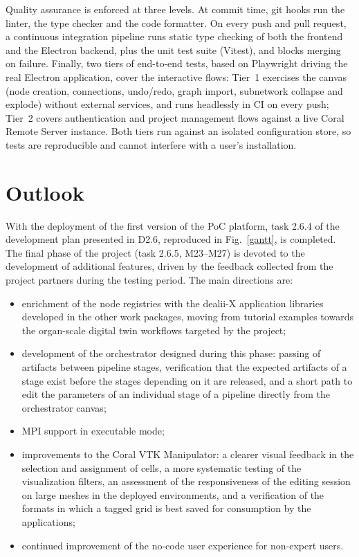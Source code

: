 \documentclass[a4paper,12pt]{article}
\begin{document}
Quality assurance is enforced at three levels. At commit time, git hooks run
the linter, the type checker and the code formatter. On every push and pull
request, a continuous integration pipeline runs static type checking of both
the frontend and the Electron backend, plus the unit test suite (Vitest),
and blocks merging on failure. Finally, two tiers of end-to-end tests, based
on Playwright driving the real Electron application, cover the interactive
flows: Tier~1 exercises the canvas (node creation, connections, undo/redo,
graph import, subnetwork collapse and explode) without external services,
and runs headlessly in CI on every push; Tier~2 covers authentication and
project management flows against a live Coral Remote Server instance. Both
tiers run against an isolated configuration store, so tests are reproducible
and cannot interfere with a user's installation.

\section{\textcolor{EUblue}{Outlook}}
\label{sec:outlook}

With the deployment of the first version of the PoC platform, task 2.6.4 of
the development plan presented in D2.6, reproduced in Fig.~\ref{gantt}, is
completed. The
final phase of the project (task 2.6.5, M23--M27) is devoted to the
development of additional features, driven by the feedback collected from
the project partners during the testing period. The main directions are:

\begin{itemize}
    \item enrichment of the node registries with the dealii-X application
        libraries developed in the other work packages, moving from tutorial
        examples towards the organ-scale digital twin workflows targeted by
        the project;
    \item development of the orchestrator designed during this phase: passing
        of artifacts between pipeline stages, verification that the expected
        artifacts of a stage exist before the stages depending on it are
        released, and a short path to edit the parameters of an individual stage of a
        pipeline directly from the orchestrator canvas;
    \item MPI support in executable mode;
    \item improvements to the Coral VTK Manipulator: a clearer visual feedback
        in the selection and assignment of cells, a more systematic testing of
        the visualization filters, an assessment of the responsiveness of the
        editing session on large meshes in the deployed environments, and a
        verification of the formats in which a tagged grid is best saved for
        consumption by the applications;
    \item continued improvement of the no-code user experience for
        non-expert users.
\end{itemize}
\end{document}
